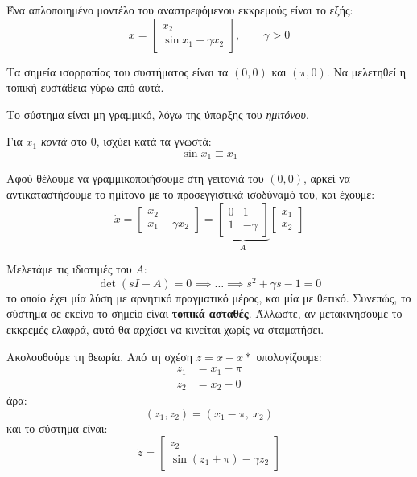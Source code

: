 \documentclass[11pt,a4paper,notitlepage,fleqn]{article}
\begin{document}
\begin{exercise}[Παράδειγμα]
	Ένα απλοποιημένο μοντέλο του αναστρεφόμενου εκκρεμούς είναι το εξής:
	\[
	\dot x = \left[\begin{matrix}
	x_2 \\ \sin x_1 - γ x_2 \end{matrix}
	\right], \qquad γ > 0
	\]

	Τα σημεία ισορροπίας του συστήματος είναι τα \( (0,0) \) και
	\( (π,0) \). Να μελετηθεί
	η τοπική ευστάθεια γύρω από αυτά.

	Το σύστημα είναι μη γραμμικό, λόγω της ύπαρξης του \textit{ημιτόνου}.

	Για \( x_1 \) \textit{κοντά} στο 0, ισχύει κατά τα γνωστά:
	\[
	\sin x_1 \equiv x_1
	\]

	Αφού θέλουμε να γραμμικοποιήσουμε στη γειτονιά του \( (0,0) \), αρκεί
	να αντικαταστήσουμε το ημίτονο με το προσεγγιστικά ισοδύναμό του,
	και έχουμε:
	\[
	\dot x = \left[\begin{matrix}
	x_2 \\ x_1-γx_2
	\end{matrix}\right] = \underbrace{\left[\begin{matrix}
	0 & 1 \\ 1 & -\gamma
	\end{matrix}\right]}_A \left[\begin{matrix}
	x_1 \\ x_2
	\end{matrix}\right]
	\]

	Μελετάμε τις ιδιοτιμές του \( A \):
	\[
	\det(sI-A) = 0 \implies \dots \implies s^2 + \gamma s - 1 = 0
	\]
	το οποίο έχει μία λύση με αρνητικό πραγματικό μέρος, και μία με θετικό.
	Συνεπώς, το σύστημα σε εκείνο το σημείο είναι
	\textbf{τοπικά ασταθές}. Άλλωστε, αν μετακινήσουμε το εκκρεμές ελαφρά,
	αυτό θα αρχίσει να κινείται χωρίς να σταματήσει.

	Ακολουθούμε τη θεωρία. Από τη σχέση \( z = x-x* \) υπολογίζουμε:
	\begin{align*}
		z_1 &= x_1 - π \\
		z_2 &= x_2 - 0
	\end{align*}
	άρα: \[
	(z_1,z_2) = \left(x_1-π, \ x_2\right)
	\]
	και το σύστημα είναι:
	\[
	\dot z = \left[\begin{matrix}
	z_2 \\ \sin(z_1 + π) - \gamma z_2
	\end{matrix}\right]
	\]


\end{exercise}
\end{document}

